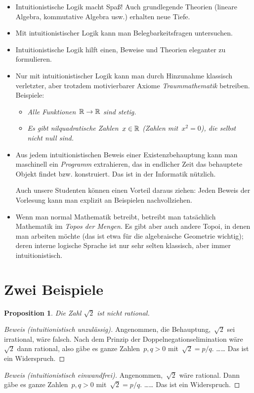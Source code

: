 \documentclass{algblatt}
\theoremstyle{plain}
\newtheorem{prop}{Proposition}
\begin{document}
\begin{itemize}
\item Intuitionistische Logik macht Spaß! Auch grundlegende Theorien (lineare
Algebra, kommutative Algebra usw.) erhalten neue Tiefe.
\item Mit intuitionistischer Logik kann man Belegbarkeitsfragen untersuchen.
\item Intuitionistische Logik hilft einen, Beweise und Theorien eleganter zu
formulieren.
\item Nur mit intuitionistischer Logik kann man durch Hinzunahme klassisch
verletzter, aber trotzdem motivierbarer Axiome \emph{Traummathematik}
betreiben. Beispiele:

\begin{itemize}
\item \emph{Alle Funktionen~$\mathbb{R} \to \mathbb{R}$ sind stetig.}
\item \emph{Es gibt nilquadratische Zahlen~$x \in \mathbb{R}$ (Zahlen mit~$x^2
= 0$), die selbst nicht null sind.}
\end{itemize}

\item Aus jedem intuitionistischen Beweis einer Existenzbehauptung kann man
maschinell ein \emph{Programm} extrahieren, das in endlicher Zeit das
behauptete Objekt findet bzw. konstruiert. Das ist in der Informatik nützlich.

Auch unsere Studenten können einen Vorteil daraus ziehen: Jeden Beweis der
Vorlesung kann man explizit an Beispielen nachvollziehen.

\item Wenn man normal Mathematik betreibt, betreibt man tatsächlich Mathematik
im \emph{Topos der Mengen}. Es gibt aber auch andere Topoi, in denen man
arbeiten möchte (das ist etwa für die algebraische Geometrie wichtig); deren
interne logische Sprache ist nur sehr selten klassisch, aber immer
intuitionistisch.
\end{itemize}


\section*{Zwei Beispiele}

\begin{prop}Die Zahl $\sqrt{2}$ ist nicht rational.\end{prop}
\begin{proof}[Beweis (intuitionistisch unzulässig)] Angenommen, die
Behauptung,~$\sqrt{2}$ sei irrational, wäre falsch. Nach dem Prinzip der
Doppelnegationselimination wäre~$\sqrt{2}$ dann rational, also gäbe es ganze
Zahlen~$p,q > 0$ mit~$\sqrt{2} = p/q$. \ldots\ldots{} Das ist ein
Widerspruch.\end{proof}
\begin{proof}[Beweis (intuitionistisch einwandfrei)] Angenommen,~$\sqrt{2}$ wäre
rational. Dann gäbe es ganze Zahlen~$p,q > 0$ mit~$\sqrt{2} = p/q$.
\ldots\ldots{} Das ist ein Widerspruch.\end{proof}
\end{document}
